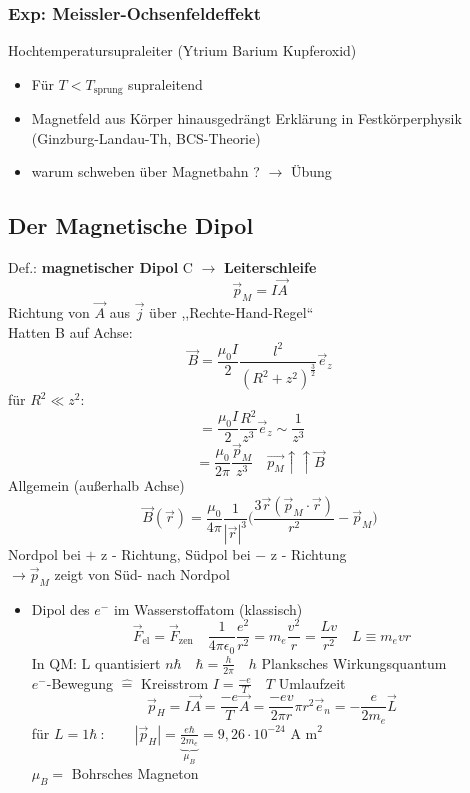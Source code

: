 \documentclass[titlepage,12pt,a4paper,ngerman]{report}
\newcommand{\tx}[1]{\textrm{#1}}
\newcommand{\ub}[1]{\underbrace{#1}}
\begin{document}
\subsubsection{Exp: Meissler-Ochsenfeldeffekt}
Hochtemperatursupraleiter (Ytrium Barium Kupferoxid) \\
\begin{itemize}
	\item Für $ T < T_{\tx{sprung}} $ supraleitend
	\item Magnetfeld aus Körper hinausgedrängt Erklärung in Festkörperphysik (Ginzburg-Landau-Th, BCS-Theorie)
	\item warum schweben über Magnetbahn ? $ \rightarrow $ Übung
\end{itemize}
\subsection{Der Magnetische Dipol}
Def.: \textbf{magnetischer Dipol} C $ \rightarrow $ \textbf{Leiterschleife}\\
$$ \boxed{\vec{p}_M = I \vec{A}} $$
Richtung von $ \vec{A} $ aus $ \vec{j} $ über ,,Rechte-Hand-Regel``\\
Hatten B auf Achse: $$ \vec{B} = \frac{\mu_0 I}{2} \frac{l^2}{(R^2 + z^2 ) ^{\frac{3}{2}}} \vec{e}_z $$
für $ R^2 \ll z^2 $: $$= \frac{\mu_0 I}{2} \frac{R^2}{z^3} \vec{e}_z \sim \boxed{\frac{1}{z^3}}\quad  \, $$
$$ = \frac{\mu_0 }{2 \pi} \frac{\vec{p}_M}{z^3} \quad \boxed{\vec{p_M} \uparrow \uparrow \vec{B}}$$
Allgemein (außerhalb Achse)\\
$$ \vec{B} (\vec{r}) = \frac{\mu_0}{4 \pi} \frac{1}{| \vec{r} | ^3} \bigg( \frac{3 \vec{r} (\vec{p}_M \cdot \vec{r})}{r^2} - \vec{p}_M \bigg) $$
Nordpol bei $+$ z - Richtung, Südpol bei $-$ z - Richtung\\
$ \rightarrow \vec{p}_M $ zeigt von Süd- nach Nordpol\\
\begin{itemize}
	\item Dipol des $ e^- $ im Wasserstoffatom (klassisch)\\
	$$ \vec{F}_{\tx{el}} = \vec{F}_{\tx{zen}} \quad \frac{1}{4 \pi \epsilon_0} \frac{e^2}{r^2} = m_e \frac{v^2}{r} = \frac{Lv}{r^2} \quad L \equiv m_e v r $$
	In QM: L quantisiert $ n \hbar \quad \hbar = \frac{h}{2 \pi} \quad h $ Planksches Wirkungsquantum\\
	$ e^- $-Bewegung $ \widehat{=} $ Kreisstrom $ I = \frac{-e}{T}  \quad T $ Umlaufzeit\\
	$$ \vec{p}_H = I \vec{A} = \frac{-e}{T} \vec{A} = \frac{-e v}{2 \pi r} \pi r^2 \vec{e}_n = - \frac{e}{2 m_e} \vec{L} $$
	für $ L = 1 \hbar \ :\qquad  |\vec{p}_H | = \ub{\frac{e \hbar}{2 m_e}}_{\mu_B} = 9,26 \cdot 10^{-24} \tx{ A m} ^2   $\\
	$ \mu_B = $ Bohrsches Magneton 
\end{itemize} 
\end{document}
